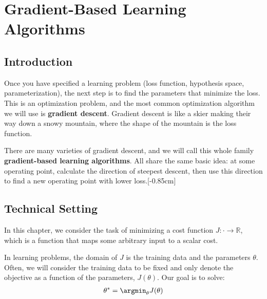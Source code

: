 \chapter{Gradient-Based Learning Algorithms}\label{chapter-gradient_descent}


\section{Introduction}

Once you have specified a learning problem (loss function, hypothesis space, parameterization), the next step is to find the parameters that minimize the loss. This is an optimization problem, and the most common optimization algorithm we will use is \textbf{gradient descent}. Gradient descent is like a skier making their way down a snowy mountain, where the shape of the mountain is the loss function.

There are many varieties of gradient descent, and we will call this whole family \textbf{gradient-based learning algorithms}. All share the same basic idea: at some operating point, calculate the direction of steepest descent, then use this direction to find a new operating point with lower loss.[-0.85cm]

\section{Technical Setting}
In this chapter, we consider the task of minimizing a cost function $J: \cdot \rightarrow \mathbb{R}$, which is a function that maps some arbitrary input to a scalar cost. %

In learning problems, the domain of $J$ is the training data and the parameters $\theta$. Often, we will consider the training data to be fixed and only denote the objective as a function of the parameters, $J(\theta)$. Our goal is to solve:
\begin{align}
    \theta^* = \argmin_{\theta} J(\theta)
\end{align}

